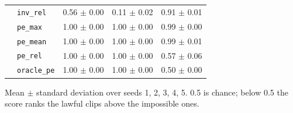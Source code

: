 \begin{table}[t]
\begin{tabular}{llccc}
 & \texttt{inv\_rel} & 0.56 $\pm$ 0.00 & 0.11 $\pm$ 0.02 & 0.91 $\pm$ 0.01\\
 & \texttt{pe\_max} & 1.00 $\pm$ 0.00 & 1.00 $\pm$ 0.00 & 0.99 $\pm$ 0.00\\
 & \texttt{pe\_mean} & 1.00 $\pm$ 0.00 & 1.00 $\pm$ 0.00 & 0.99 $\pm$ 0.01\\
 & \texttt{pe\_rel} & 1.00 $\pm$ 0.00 & 1.00 $\pm$ 0.00 & 0.57 $\pm$ 0.06\\
 & \texttt{oracle\_pe} & 1.00 $\pm$ 0.00 & 1.00 $\pm$ 0.00 & 0.50 $\pm$ 0.00\\
\bottomrule
\end{tabular}
\par\smallskip\footnotesize Mean $\pm$ standard deviation over seeds 1, 2, 3, 4, 5. 0.5 is chance; below 0.5 the score ranks the lawful clips above the impossible ones.
\end{table}
